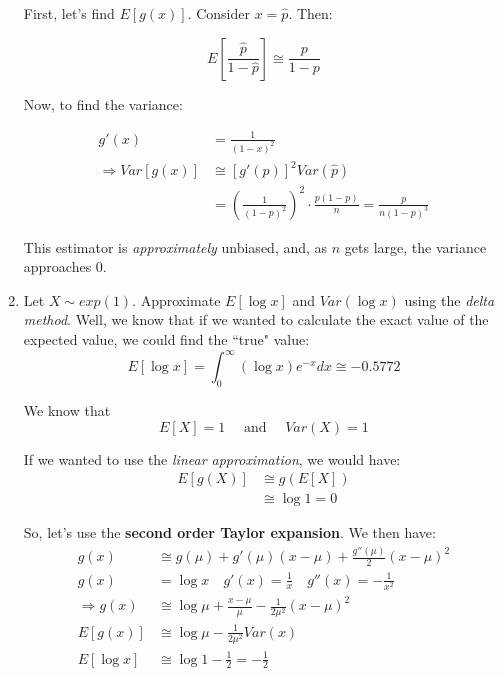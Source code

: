 \documentclass{article}
\begin{document}
\begin{enumerate}
    First, let's find $E[g(x)]$. Consider $x = \hat{p}$. Then:
    
    \begin{equation*}
        E\left[\frac{\hat{p}}{1-\hat{p}} \right] \cong \frac{p}{1-p}
    \end{equation*}
    
    Now, to find the variance:
    
    \begin{equation*}
        \begin{split}
            g'(x) &= \frac{1}{(1-x)^2}\\
            \Rightarrow Var[g(x)] &\cong \left[g'(p) \right]^2 Var\left(\hat{p}\right)\\
            &= \left(\frac{1}{(1-p)^2} \right)^2\cdot \frac{p(1-p)}{n} = \frac{p}{n(1-p)^3}
        \end{split}
    \end{equation*}
    
    This estimator is \textit{approximately} unbiased, and, as $n$ gets large, the variance approaches $0$.
    
    \item Let $X \sim exp(1)$. Approximate $E[\log x]$ and $Var(\log x)$ using the \textit{delta method}. Well, we know that if we wanted to calculate the exact value of the expected value, we could find the ``true" value:
    \begin{equation*}
        E[\log x] = \int_0^\infty (\log x) e^{-x}dx \cong -0.5772
    \end{equation*}
    
    We know that
    \begin{equation*}
        E[X] = 1 \quad \text{ and } \quad Var(X) = 1
    \end{equation*}
    
    If we wanted to use the \textit{linear approximation}, we would have:
    \begin{equation*}
        \begin{split}
            E[g(X)] &\cong g\left(E[X] \right)\\
            &\cong \log 1 = 0
        \end{split}
    \end{equation*}
    
    So, let's use the \textbf{second order Taylor expansion}. We then have:
    \begin{equation*}
    \begin{split}
        g(x) &\cong g(\mu) + g'(\mu)(x-\mu) + \frac{g''(\mu)}{2}(x-\mu)^2\\
        g(x) &= \log x \quad g'(x) = \frac{1}{x} \quad g''(x) = -\frac{1}{x^2}\\
        \Rightarrow g(x) &\cong \log \mu + \frac{x-\mu}{\mu} - \frac{1}{2\mu^2}(x-\mu)^2\\
        E[g(x)] &\cong \log \mu - \frac{1}{2\mu^2} Var(x)\\
        E[\log x] &\cong \log 1 - \frac{1}{2} = -\frac{1}{2}
    \end{split}
    \end{equation*}
    

\end{enumerate}
\end{document}
